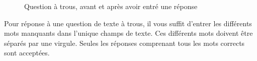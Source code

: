 \documentclass[11pt]{scrreprt}
\begin{document}
\begin{figure}[H]
{        }
        \caption{Question à trous, avant et après avoir entré une réponse}
    \end{figure}
    Pour réponse à une question de texte à trous, il vous suffit d'entrer les différents mots manquants dans l'unique champs de texte. Ces différents mots doivent être séparés par une virgule. Seules les réponses comprenant tous les mots corrects sont acceptées.
\end{document}
